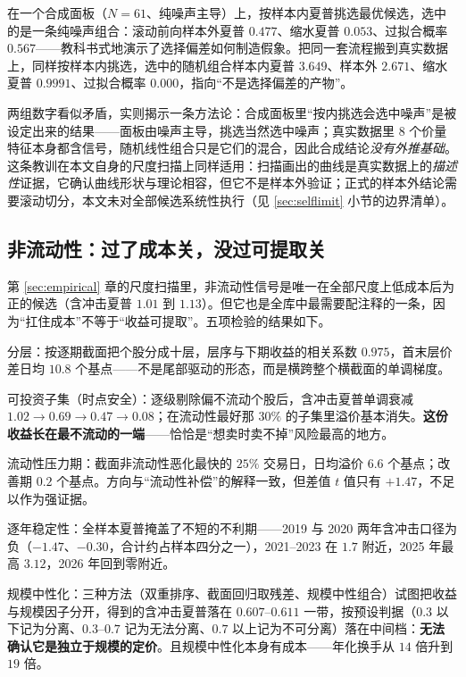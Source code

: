 在一个合成面板（$N=61$、纯噪声主导）上，按样本内夏普挑选最优候选，选中的是一条纯噪声组合：滚动前向样本外夏普 $0.477$、缩水夏普 $0.053$、过拟合概率 $0.567$——教科书式地演示了选择偏差如何制造假象。把同一套流程搬到真实数据上，同样按样本内挑选，选中的随机组合样本内夏普 $3.649$、样本外 $2.671$、缩水夏普 $0.9991$、过拟合概率 $0.000$，指向“不是选择偏差的产物”。

两组数字看似矛盾，实则揭示一条方法论：合成面板里“按内挑选会选中噪声”是被设定出来的结果——面板由噪声主导，挑选当然选中噪声；真实数据里 $8$ 个价量特征本身都含信号，随机线性组合只是它们的混合，因此合成结论\emph{没有外推基础}。这条教训在本文自身的尺度扫描上同样适用：扫描画出的曲线是真实数据上的\emph{描述性}证据，它确认曲线形状与理论相容，但它不是样本外验证；正式的样本外结论需要滚动切分，本文未对全部候选系统性执行（见 \ref{sec:selflimit} 小节的边界清单）。

\subsection{非流动性：过了成本关，没过可提取关}

第 \ref{sec:empirical} 章的尺度扫描里，非流动性信号是唯一在全部尺度上低成本后为正的候选（含冲击夏普 $1.01$ 到 $1.13$）。但它也是全库中最需要配注释的一条，因为“扛住成本”不等于“收益可提取”。五项检验的结果如下。

分层：按逐期截面把个股分成十层，层序与下期收益的相关系数 $0.975$，首末层价差日均 $10.8$ 个基点——不是尾部驱动的形态，而是横跨整个横截面的单调梯度。

可投资子集（时点安全）：逐级剔除偏不流动个股后，含冲击夏普单调衰减 $1.02\to0.69\to0.47\to0.08$；在流动性最好那 $30\%$ 的子集里溢价基本消失。\textbf{这份收益长在最不流动的一端}——恰恰是“想卖时卖不掉”风险最高的地方。

流动性压力期：截面非流动性恶化最快的 $25\%$ 交易日，日均溢价 $6.6$ 个基点；改善期 $0.2$ 个基点。方向与“流动性补偿”的解释一致，但差值 $t$ 值只有 $+1.47$，不足以作为强证据。

逐年稳定性：全样本夏普掩盖了不短的不利期——2019 与 2020 两年含冲击口径为负（$-1.47$、$-0.30$，合计约占样本四分之一），2021--2023 在 $1.7$ 附近，2025 年最高 $3.12$，2026 年回到零附近。

规模中性化：三种方法（双重排序、截面回归取残差、规模中性组合）试图把收益与规模因子分开，得到的含冲击夏普落在 $0.607$--$0.611$ 一带，按预设判据（$0.3$ 以下记为分离、$0.3$--$0.7$ 记为无法分离、$0.7$ 以上记为不可分离）落在中间档：\textbf{无法确认它是独立于规模的定价}。且规模中性化本身有成本——年化换手从 $14$ 倍升到 $19$ 倍。

